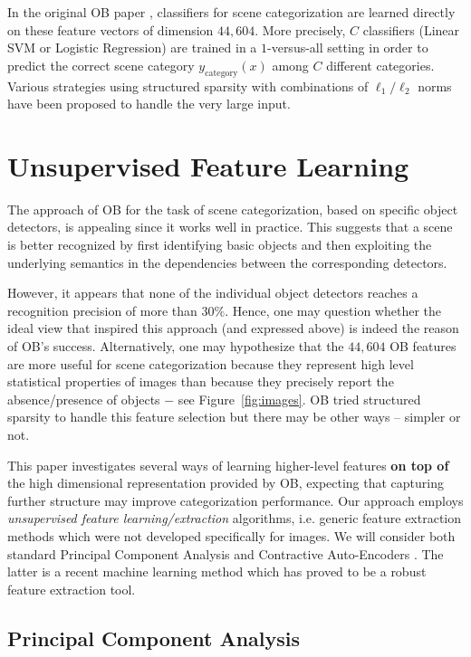 \documentclass[runningheads,a4paper]{llncs}
\begin{document}
In the original OB paper \citep{LiJiaLi10}, classifiers for scene
categorization are learned directly on these feature vectors of
dimension $44,604$.
%
More precisely, $C$ classifiers (Linear SVM or
Logistic Regression) are trained in a $1$-versus-all setting in order to predict the
correct scene category $y_{\textrm{category}}(x)$ among $C$ different
categories.
%
Various strategies using structured sparsity with combinations
  of $\ell_1/\ell_2$ norms have been proposed to handle the
  very large input.

\section{Unsupervised Feature Learning}\label{sec:feat}

The approach of OB for the task of scene categorization,
based on specific object detectors, is appealing since it works well
in practice.
%
This suggests that a scene is better recognized by first identifying
basic objects and then exploiting the underlying semantics in the
dependencies between the corresponding detectors.
%

However, it appears that none of the individual object detectors
reaches a recognition precision of more than $30\%$. Hence, one may
question whether the ideal view that inspired this approach (and
expressed above) is indeed the reason of OB's success.
%
Alternatively, one may hypothesize that the $44,604$ OB features are
more useful for scene categorization because they represent high level
statistical properties of images than because they precisely report the 
absence/presence of objects $-$ see Figure~\ref{fig:images}.
%
OB tried structured sparsity to handle this feature selection but there may be
  other ways -- simpler or not.

This paper investigates several ways of learning higher-level features
{\bf on top of} the high dimensional representation provided by OB,
expecting that capturing further structure may improve categorization
performance. Our approach employs \textit{unsupervised feature
  learning/extraction} algorithms, i.e. generic feature extraction
methods which were not developed specifically for images. We will
consider both standard Principal Component Analysis and
Contractive Auto-Encoders
\citep{Rifai+al-2011}. The latter is a recent machine
learning method which has proved to be a robust feature extraction
tool.

\subsection{Principal Component Analysis}
\end{document}
